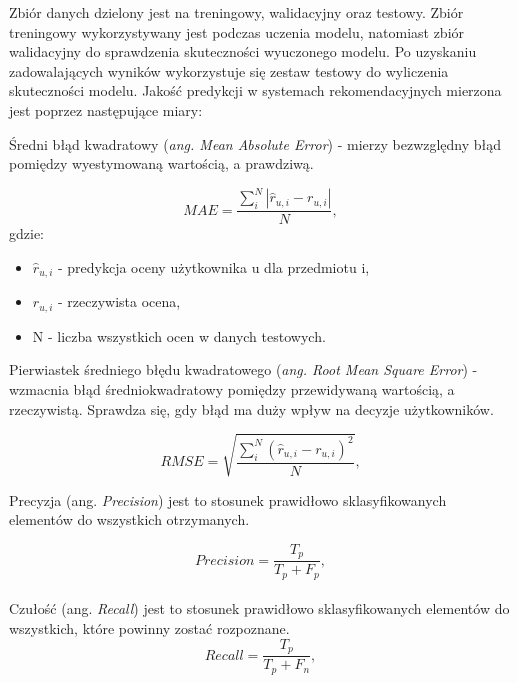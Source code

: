 Zbiór danych dzielony jest na treningowy, walidacyjny oraz testowy. Zbiór treningowy wykorzystywany jest podczas uczenia modelu, natomiast zbiór walidacyjny do sprawdzenia skuteczności wyuczonego modelu. Po uzyskaniu zadowalających wyników wykorzystuje się zestaw testowy do wyliczenia skuteczności modelu. Jakość predykcji w systemach rekomendacyjnych mierzona jest poprzez następujące miary:

Średni błąd kwadratowy (\textit{ang. Mean Absolute Error}) - mierzy bezwzględny błąd pomiędzy wyestymowaną wartością, a prawdziwą.

\begin{equation}
    MAE = \frac{\sum\limits_{i}^{N}|\hat{r}_{u,i} - r_{u,i}|}{N},
\end{equation} gdzie:
\begin{itemize}
    \item $\hat{r}_{u,i}$ - predykcja oceny użytkownika u dla przedmiotu i,
    \item $r_{u,i}$ - rzeczywista ocena,
    \item N - liczba wszystkich ocen w danych testowych.
\end{itemize}

Pierwiastek średniego błędu kwadratowego (\textit{ang. Root Mean Square Error}) - wzmacnia błąd średniokwadratowy pomiędzy przewidywaną wartością, a rzeczywistą. Sprawdza się, gdy błąd ma duży wpływ na decyzje użytkowników.

\begin{equation}
    RMSE = \sqrt{\frac{\sum\limits_{i}^{N}(\hat{r}_{u,i} - r_{u,i})^2}{N}},
\end{equation}

Precyzja (ang. \textit{Precision}) jest to stosunek prawidłowo sklasyfikowanych elementów do wszystkich otrzymanych.

\begin{equation}
    Precision = \frac{T_p}{T_p + F_p},
\end{equation} \\
Czułość (ang. \textit{Recall}) jest to stosunek prawidłowo sklasyfikowanych elementów do wszystkich, które powinny zostać rozpoznane.
\begin{equation}
    Recall = \frac{T_p}{T_p + F_n},
\end{equation} \\

